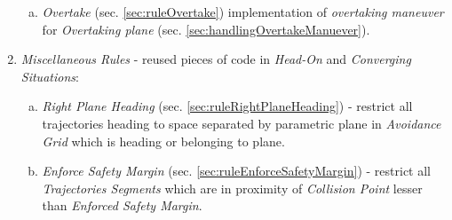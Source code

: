 \begin{enumerate}
\begin{enumerate}[a.]
        \item \emph{Overtake} (sec. \ref{sec:ruleOvertake}) implementation of \emph{overtaking maneuver} for \emph{Overtaking plane} (sec. \ref{sec:handlingOvertakeManuever}).
    \end{enumerate}
    
    \item \emph{Miscellaneous Rules} - reused pieces of code in \emph{Head-On} and \emph{Converging Situations}:
    \begin{enumerate}[a.]
        \item \emph{Right Plane Heading} (sec. \ref{sec:ruleRightPlaneHeading}) - restrict all trajectories heading to space separated by parametric plane in \emph{Avoidance Grid} which is heading or belonging to plane.
        
        \item \emph{Enforce Safety Margin} (sec. \ref{sec:ruleEnforceSafetyMargin}) - restrict all \emph{Trajectories Segments} which are in proximity of \emph{Collision Point} lesser than \emph{Enforced Safety Margin}.
    \end{enumerate}
\end{enumerate}
